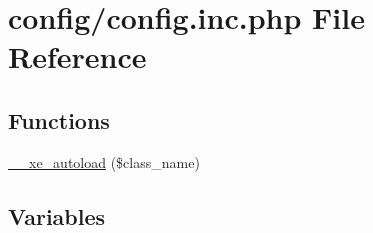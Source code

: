 \hypertarget{config_8inc_8php}{}\section{config/config.inc.\+php File Reference}
\label{config_8inc_8php}
\subsection*{Functions}
\begin{DoxyCompactItemize}
\item 
\hyperlink{config_8inc_8php_abfce4e385de51213b8fa8dce2eb3b0c3}{\+\_\+\+\_\+xe\+\_\+autoload} (\$class\+\_\+name)
\end{DoxyCompactItemize}
\subsection*{Variables}
